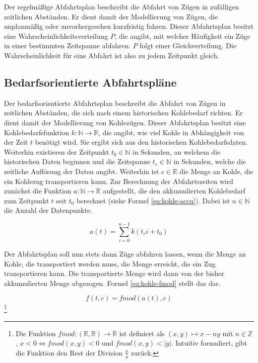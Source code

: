 Der regelmäßige Abfahrtsplan beschreibt die Abfahrt von Zügen in zufälligen zeitlichen Abständen. Er dient damit der Modellierung von Zügen, die unplanmäßig oder unvorhergesehen kurzfristig fahren. Dieser Abfahrtsplan besitzt eine Wahrscheinlichkeitsverteilung $P$, die angibt, mit welcher Häufigkeit ein Züge in einer bestimmten Zeitspanne abfahren. $P$ folgt einer Gleichverteilung. Die Wahrscheinlichkeit für eine Abfahrt ist also zu jedem Zeitpunkt gleich.

\subsection{Bedarfsorientierte Abfahrtspläne}

Der bedarfsorientierte Abfahrtsplan beschreibt die Abfahrt von Zügen in zeitlichen Abständen, die sich nach einem historischen Kohlebedarf richten. Er dient damit der Modellierung von Kohlezügen. Dieser Abfahrtsplan besitzt eine Kohlebedarfsfunktion $k:\mathbb{N}\to\mathbb{R}$, die angibt, wie viel Kohle in Abhängigkeit von der Zeit $t$ benötigt wird. Sie ergibt sich aus den historischen Kohlebedarfsdaten. Weiterhin existieren der Zeitpunkt $t_0 \in \mathbb{N}$ in Sekunden, an welchem die historischen Daten beginnen und die Zeitspanne $t_r \in \mathbb{N}$ in Sekunden, welche die zeitliche Auflösung der Daten angibt. Weiterhin ist $c\in\mathbb{R}$ die Menge an Kohle, die ein Kohlezug transportieren kann. Zur Berechnung der Abfahrtszeiten wird zunächst die Funktion $a: \mathbb{N} \to \mathbb{R}$ aufgestellt, die den akkumulierten Kohlebedarf zum Zeitpunkt $t$ seit $t_0$ berechnet (siehe Formel \ref{eq:kohle-accu}). Dabei ist $n\in\mathbb{N}$ die Anzahl der Datenpunkte.

\begin{equation}
    a(t)=\sum_{i=0}^{n-1}  k(t_ri+t_0)\label{eq:kohle-accu}
\end{equation}

Der Abfahrtsplan soll nun stets dann Züge abfahren lassen, wenn die Menge an Kohle, die transportiert werden muss, die Menge erreicht, die ein Zug transportieren kann. Die transportierte Menge wird dann von der bisher akkumulierten Menge abgezogen. Formel \ref{eq:kohle-fmod} stellt das dar.

\begin{equation}
    f(t, c)=fmod(a(t), c)\label{eq:kohle-fmod}
\end{equation}\footnote{Die Funktion $fmod:(\mathbb{R},\mathbb{R}) \to \mathbb{R}$ ist definiert als $(x,y)\mapsto x-ny$ mit $n\in\mathbb{Z}$, $x<0\Leftrightarrow fmod(x,y)<0$ und $fmod(x,y)<|y|$. Intuitiv formuliert, gibt die Funktion den Rest der Division $\frac{x}{y}$ zurück.}


